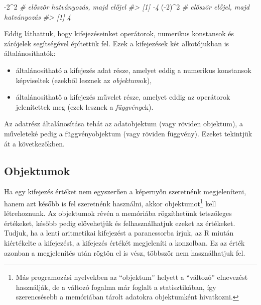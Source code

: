 \documentclass[
]{book}
\newenvironment{Shaded}{\begin{snugshade}}{\end{snugshade}}
\newcommand{\CommentTok}[1]{\textcolor[rgb]{0.56,0.35,0.01}{\textit{#1}}}
\newcommand{\DecValTok}[1]{\textcolor[rgb]{0.00,0.00,0.81}{#1}}
\newcommand{\NormalTok}[1]{#1}
\newcommand{\SpecialCharTok}[1]{\textcolor[rgb]{0.00,0.00,0.00}{#1}}
\providecommand{\tightlist}{%
  \setlength{\itemsep}{0pt}\setlength{\parskip}{0pt}}
\begin{document}
\begin{Shaded}
\begin{Highlighting}[]
\SpecialCharTok{{-}}\DecValTok{2}\SpecialCharTok{\^{}}\DecValTok{2}    \CommentTok{\# először hatványozás, majd előjel}
\CommentTok{\#\textgreater{} [1] {-}4}
\NormalTok{(}\SpecialCharTok{{-}}\DecValTok{2}\NormalTok{)}\SpecialCharTok{\^{}}\DecValTok{2}  \CommentTok{\# először előjel, majd hatványozás}
\CommentTok{\#\textgreater{} [1] 4}
\end{Highlighting}
\end{Shaded}

Eddig láthattuk, hogy kifejezéseinket operátorok, numerikus konstansok és zárójelek segítségével építettük fel. Ezek a kifejezések két alkotójukban is általánosíthatók:

\begin{itemize}
\tightlist
\item
  általánosítható a kifejezés adat része, amelyet eddig a numerikus konstansok képviseltek (ezekből lesznek az \emph{objektum}ok),
\item
  általánosíthatő a kifejezés művelet része, amelyet eddig az operátorok jelenítettek meg (ezek lesznek a \emph{függvény}ek).
\end{itemize}

Az adatrész általánosítása tehát az adatobjektum (vagy röviden objektum), a műveleteké pedig a függvényobjektum (vagy röviden függvény). Ezeket tekintjük át a következőkben.

\hypertarget{objektumok}{%
\subsection{Objektumok}\label{objektumok}}

Ha egy kifejezés értéket nem egyszerűen a képernyőn szeretnénk megjeleníteni, hanem azt később is fel szeretnénk használni, akkor objektumot\footnote{Más programozási nyelvekben az ``objektum'' helyett a ``változó'' elnevezést használják, de a változó fogalma már foglalt a statisztikában, így szerencsésebb a memóriában tárolt adatokra objektumként hivatkozni.} kell létrehoznunk. Az objektumok révén a memóriába rögzíthetünk tetszőleges értékeket, később pedig elővehetjük és felhasználhatjuk ezeket az értékeket.
Tudjuk, ha a lenti aritmetikai kifejezést a parancssorba írjuk, az R miután kiértékelte a kifejezést, a kifejezés értékét megjeleníti a konzolban. Ez az érték azonban a megjelenítés után rögtön el is vész, többször nem használhatjuk fel.
\end{document}
